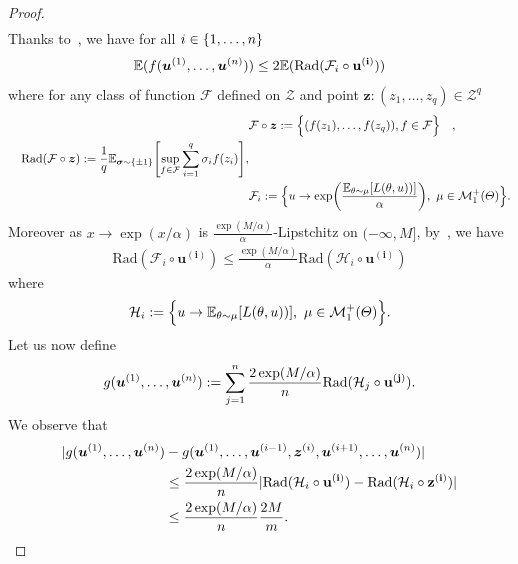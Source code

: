 \begin{proof}
\begin{align*}
\end{align*}
Thanks to~\citep[Lemma 26.2]{shalev2014understanding}, we have for all $i\in\{1,\dots,n\}$
\begin{align*}
\mathbb{E}(f(\bm{u}^{(1)},\dots,\bm{u}^{(n)}))\leq 2 \mathbb{E}(\text{Rad}(\mathcal{F}_i\circ \mathbf{u^{(i)}}))    
\end{align*}
where for any class of function $\mathcal{F}$ defined on $\mathcal{Z}$  and point $\bm{z}:(z_1,\dots,z_q)\in\mathcal{Z}^q$
\begin{align*}
    &\mathcal{F}\circ \bm{z}:=\Big\{(f(z_1),\dots,f(z_q)),f\in\mathcal{F}\Big\} \quad,\\\quad \text{Rad}(\mathcal{F}\circ \bm{z}):=\frac{1}{q}\mathbb{E}_{\bm{\sigma}\sim\{\pm 1\}}\left[\sup_{f\in\mathcal{F}}\sum_{i=1}^q\sigma_if(z_i)\right],\\
    &\mathcal{F}_i:=\Big\{u\rightarrow\exp\left(\frac{\mathbb{E}_{\theta \sim \mu}\left[\loss(\theta,u))\right]}{\alpha}\right),~\mu\in\mathcal{M}_{1}^{+}(\Theta) \Big\}.
      \end{align*}
Moreover as $x\rightarrow\exp(x/\alpha)$ is $\frac{\exp(M/\alpha)}{\alpha}$-Lipstchitz on $(-\infty,M]$, by~\citep[Lemma 26.9]{shalev2014understanding}, we have 
\begin{align*}
   \text{Rad}(\mathcal{F}_i\circ \mathbf{u^{(i)}})\leq \frac{\exp(M/\alpha)}{\alpha} \text{Rad}(\mathcal{H}_i\circ \mathbf{u^{(i)}}) 
\end{align*}
where 
\begin{align*}
    \mathcal{H}_i:=\Big\{u\rightarrow \mathbb{E}_{\theta \sim \mu}\left[\loss(\theta,u))\right],~\mu\in\mathcal{M}_{1}^{+}(\Theta) \Big\}.
\end{align*}
Let us now define
\begin{align*}
    g(\bm{u}^{(1)},\dots,\bm{u}^{(n)}):=\sum_{j=1}^n\frac{2\exp(M/\alpha)}{n}\text{Rad}(\mathcal{H}_j\circ \mathbf{u^{(j)}}).
\end{align*}
We observe that 
\begin{align*}
|g(\bm{u}^{(1)},\dots,\bm{u}^{(n)}) &- g(\bm{u}^{(1)},\dots,\bm{u}^{(i-1)},\bm{z}^{(i)},\bm{u}^{(i+1)},\dots,\bm{u}^{(n)})|\\
&\leq \frac{2\exp(M/\alpha)}{n}|\text{Rad}(\mathcal{H}_i\circ \mathbf{u^{(i)}}) - \text{Rad}(\mathcal{H}_i\circ \mathbf{z^{(i)}})|\\
&\leq \frac{2\exp(M/\alpha)}{n}\frac{2M}{m}.
\end{align*}

\end{proof}
